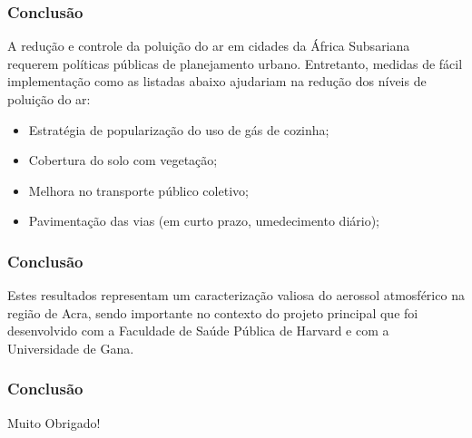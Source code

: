 \begin{frame}
  \frametitle{Conclusão}
  A redução e controle da poluição do ar em cidades da África Subsariana requerem políticas públicas de planejamento urbano. Entretanto, medidas de fácil implementação como as listadas abaixo ajudariam na redução dos níveis de poluição do ar:
  \begin{itemize}
    \item Estratégia de popularização do uso de gás de cozinha;
    \item Cobertura do solo com vegetação;
    \item Melhora no transporte público coletivo;
    \item Pavimentação das vias (em curto prazo, umedecimento diário);
  \end{itemize}
\end{frame}

\begin{frame}
  \frametitle{Conclusão}
   \begin{tcolorbox}[colback=blue!5,colframe=blue!40!black,title=Conclusão]
    Estes resultados representam um caracterização valiosa do aerossol atmosférico na região de Acra, sendo importante no contexto do projeto principal que foi desenvolvido com a Faculdade de Saúde Pública de Harvard e com a Universidade de Gana.
  \end{tcolorbox}
\end{frame}



\begin{frame}
  \frametitle{Conclusão}
  \begin{center}
    Muito Obrigado!
  \end{center}
\end{frame}
